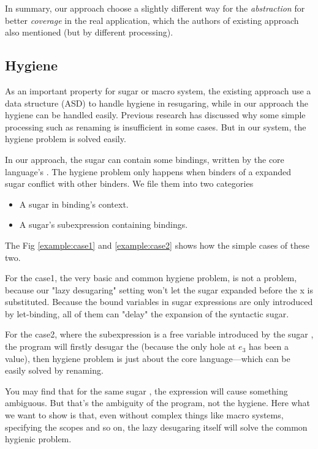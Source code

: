 In summary, our approach choose a slightly different way for the \emph{abstraction} for better \emph{coverage} in the real application, which the authors of existing approach also mentioned (but by different processing).



\subsection{Hygiene}

As an important property for sugar or macro system, the existing approach use a data structure (ASD) to handle hygiene in resugaring, while in our approach the hygiene can be handled easily. Previous research\cite{EssenceofHygiene} has discussed why some simple processing such as renaming is insufficient in some cases. But in our system, the hygiene problem is solved easily. 

In our approach, the sugar can contain some bindings, written by the core language's . The hygiene problem only happens when binders of a expanded sugar conflict with other binders. We file them into two categories
\begin{itemize}
\item A sugar in binding's context.
\item A sugar's subexpression containing bindings.
\end{itemize}
The Fig \ref{example:case1} and \ref{example:case2} shows how the simple cases of these two.


For the case1, the very basic and common hygiene problem, is not a problem, because our "lazy desugaring" setting won't let the sugar  expanded before the x is substituted. Because the bound variables in sugar expressions are only introduced by let-binding, all of them can "delay" the expansion of the syntactic sugar.

For the case2, where the subexpression  is a free variable introduced by the sugar , the program will firstly desugar the  (because the only hole at $e_3$ has been a value), then hygiene problem is just about the core language---which can be easily solved by renaming.

You may find that for the same sugar , the expression  will cause something ambiguous. But that's the ambiguity of the program, not the hygiene. Here what we want to show is that, even without complex things like macro systems, specifying the scopes and so on, the lazy desugaring itself will solve the common hygienic problem.
